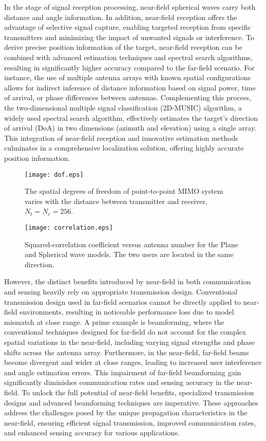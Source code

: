 \documentclass[10pt,journal,twocolumn,twoside]{IEEEtran} %
\begin{document}
In the stage of signal reception processing, near-field spherical waves carry both distance and angle information. 
In addition, near-field reception offers the advantage of selective signal capture, enabling targeted reception from specific transmitters and minimizing the impact of unwanted signals or interference. To derive precise position information of the target, near-field reception can be combined with advanced estimation techniques and spectral search algorithms, resulting in significantly higher accuracy compared to the far-field scenario. For instance, the use of multiple antenna arrays with known spatial configurations allows for indirect inference of distance information based on signal power, time of arrival, or phase differences between antennas. Complementing this process, the  two-dimensional multiple signal classification (2D-MUSIC) algorithm, a widely used spectral search algorithm, effectively estimates the target's direction of arrival (DoA) in two dimensions (azimuth and elevation) using a single array. This integration of near-field reception and innovative estimation methods culminates in a comprehensive localization solution, offering highly accurate position information.
\begin{figure}[t]
       \centering
       \texttt{[image: dof.eps]}
       \caption{The spatial degrees of freedom of point-to-point MIMO system varies with the distance between transmitter and receiver, $N_t=N_r=256$.}
       \label{fig1}
\end{figure}

\begin{figure}[t]
       \centering
       \texttt{[image: correlation.eps]}
       \caption{Squared-correlation coefficient versus antenna number for the Plane and Spherical wave models. The two users are located in the same direction.}
       \label{fig2}
\end{figure}

However, the distinct benefits introduced by near-field in both communication and sensing heavily rely on appropriate transmission design. Conventional transmission design used in far-field scenarios cannot be directly applied to near-field environments, resulting in noticeable performance loss due to model mismatch at close range.  A prime example is beamforming, where the conventional techniques designed for far-field do not account for the complex spatial variations in the near-field, including varying signal strengths and phase shifts across the antenna array. Furthermore, in the near-field, far-field beams become divergent and wider at close ranges, leading to increased user interference and angle estimation errors. This impairment of far-field beamforming gain significantly diminishes communication rates and sensing accuracy in the near-field. To unlock the full potential of near-field benefits, specialized transmission designs and advanced beamforming techniques are imperative. These approaches address the challenges posed by the unique propagation characteristics in the near-field, ensuring efficient signal transmission, improved communication rates, and enhanced sensing accuracy for various applications.
\end{document}
